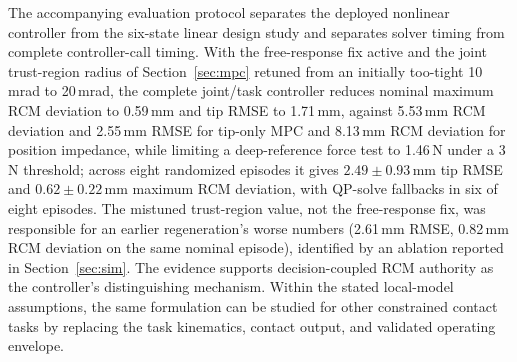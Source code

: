 The accompanying evaluation protocol separates the deployed nonlinear
controller from the six-state linear design study and separates solver timing
from complete controller-call timing. With the free-response fix active and
the joint trust-region radius of Section~\ref{sec:mpc} retuned from an
initially too-tight 10\,mrad to 20\,mrad, the complete joint/task controller
reduces nominal maximum RCM deviation to 0.59\,mm and tip RMSE to 1.71\,mm,
against 5.53\,mm RCM deviation and 2.55\,mm RMSE for tip-only MPC and
8.13\,mm RCM deviation for position impedance, while limiting a deep-reference
force test to 1.46\,N under a 3\,N threshold; across eight randomized
episodes it gives $2.49\pm0.93$\,mm tip RMSE and $0.62\pm0.22$\,mm maximum
RCM deviation, with QP-solve fallbacks in six of eight episodes. The
mistuned trust-region value, not the free-response fix, was responsible for
an earlier regeneration's worse numbers (2.61\,mm RMSE, 0.82\,mm RCM
deviation on the same nominal episode), identified by an ablation reported
in Section~\ref{sec:sim}. The evidence supports decision-coupled RCM
authority as the controller's distinguishing mechanism. Within the stated
local-model assumptions, the
same formulation can be studied for other constrained contact tasks by
replacing the task kinematics, contact output, and validated operating
envelope.

